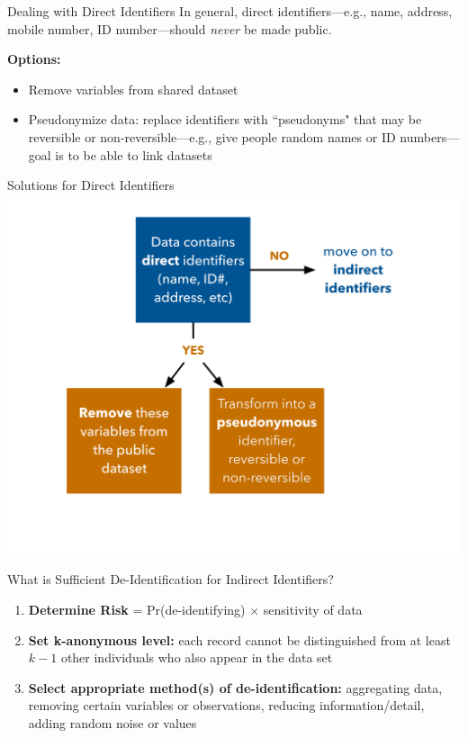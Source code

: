 \documentclass[12pt, compress]{beamer} %
\let\noteitem\item %
\renewcommand{\item}{ 
	\noteitem\vspace{\fill}
	}
\begin{document}
	\begin{frame}{Dealing with Direct Identifiers}
		In general, direct identifiers---e.g., name, address, mobile number, ID number---should \textit{never} be made public. 
		
		\bigskip
			
		\textbf{Options:}
		\begin{itemize}
			\item Remove variables from shared dataset
			\item Pseudonymize data: replace identifiers with ``pseudonyms" that may be reversible or non-reversible---e.g., give people random names or ID numbers---goal is to be able to link datasets
		\end{itemize}
	\end{frame}	
	
	\begin{frame}{Solutions for Direct Identifiers}
		 \centering \includegraphics[width=.9\textwidth]{de-identification_direct.png}
	\end{frame}
	
	\begin{frame}{What is Sufficient De-Identification for Indirect Identifiers?}
	
		\begin{enumerate}
			\item \textbf{Determine Risk} = Pr(de-identifying) $\times$ sensitivity of data
			\item \textbf{Set k-anonymous level:} each record cannot be distinguished from at least $k-1$ other individuals who also appear in the data set
			\item \textbf{Select appropriate method(s) of de-identification:} aggregating data, removing certain variables or observations, reducing information/detail, adding random noise or values 
		\end{enumerate}
	\end{frame}
	
\end{document}
